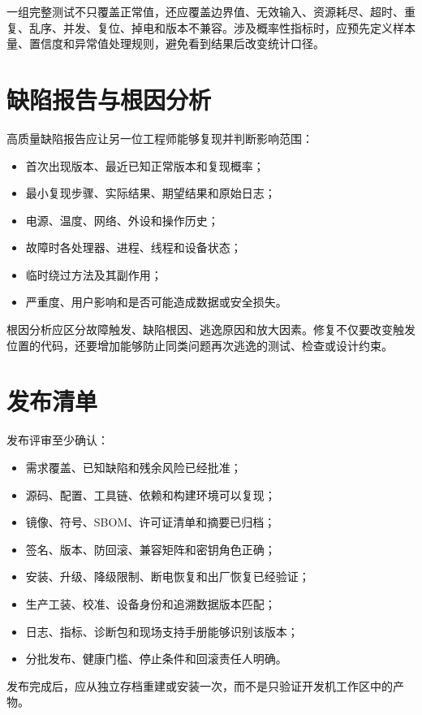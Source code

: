 一组完整测试不只覆盖正常值，还应覆盖边界值、无效输入、资源耗尽、超时、重复、乱序、并发、复位、掉电和版本不兼容。涉及概率性指标时，应预先定义样本量、置信度和异常值处理规则，避免看到结果后改变统计口径。

\section{缺陷报告与根因分析}

高质量缺陷报告应让另一位工程师能够复现并判断影响范围：
\begin{itemize}
  \item 首次出现版本、最近已知正常版本和复现概率；
  \item 最小复现步骤、实际结果、期望结果和原始日志；
  \item 电源、温度、网络、外设和操作历史；
  \item 故障时各处理器、进程、线程和设备状态；
  \item 临时绕过方法及其副作用；
  \item 严重度、用户影响和是否可能造成数据或安全损失。
\end{itemize}

根因分析应区分故障触发、缺陷根因、逃逸原因和放大因素。修复不仅要改变触发位置的代码，还要增加能够防止同类问题再次逃逸的测试、检查或设计约束。

\section{发布清单}

发布评审至少确认：
\begin{itemize}
  \item 需求覆盖、已知缺陷和残余风险已经批准；
  \item 源码、配置、工具链、依赖和构建环境可以复现；
  \item 镜像、符号、SBOM、许可证清单和摘要已归档；
  \item 签名、版本、防回滚、兼容矩阵和密钥角色正确；
  \item 安装、升级、降级限制、断电恢复和出厂恢复已经验证；
  \item 生产工装、校准、设备身份和追溯数据版本匹配；
  \item 日志、指标、诊断包和现场支持手册能够识别该版本；
  \item 分批发布、健康门槛、停止条件和回滚责任人明确。
\end{itemize}

发布完成后，应从独立存档重建或安装一次，而不是只验证开发机工作区中的产物。

